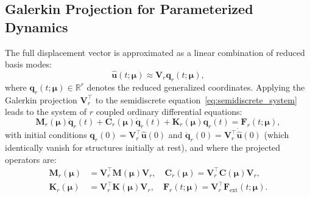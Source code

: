 \subsection{Galerkin Projection for Parameterized Dynamics}
\label{subsec:galerkin_prom}
The full displacement vector is approximated as a linear combination of reduced basis modes:
\begin{equation}
    \hat{\bm{u}}(t; \bm{\mu}) \approx \bm{V}_r \bm{q}_r(t; \bm{\mu}),
\end{equation}
where $\bm{q}_r(t; \bm{\mu}) \in \mathbb{R}^r$ denotes the reduced generalized coordinates. Applying the Galerkin projection $\bm{V}_r^\top$ to the semidiscrete equation~\eqref{eq:semidiscrete_system} leads to the system of $r$ coupled ordinary differential equations:
\begin{equation}
    \bm{M}_r(\bm{\mu}) \ddot{\bm{q}}_r(t) + \bm{C}_r(\bm{\mu}) \dot{\bm{q}}_r(t) + \bm{K}_r(\bm{\mu}) \bm{q}_r(t) = \bm{F}_r(t; \bm{\mu}),
    \label{eq:reduced_ode}
\end{equation}
with initial conditions $\bm{q}_r(0) = \bm{V}_r^\top \hat{\bm{u}}(0)$ and $\dot{\bm{q}}_r(0) = \bm{V}_r^\top \dot{\hat{\bm{u}}}(0)$ (which identically vanish for structures initially at rest), and where the projected operators are:
\begin{align}
    \bm{M}_r(\bm{\mu}) &= \bm{V}_r^\top \bm{M}(\bm{\mu}) \bm{V}_r, \quad \bm{C}_r(\bm{\mu}) = \bm{V}_r^\top \bm{C}(\bm{\mu}) \bm{V}_r, \label{eq:red_matrices1} \\
    \bm{K}_r(\bm{\mu}) &= \bm{V}_r^\top \bm{K}(\bm{\mu}) \bm{V}_r, \quad \bm{F}_r(t; \bm{\mu}) = \bm{V}_r^\top \bm{F}_{\text{ext}}(t; \bm{\mu}). \label{eq:red_matrices2}
\end{align}

